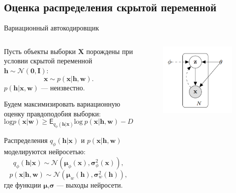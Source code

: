 \documentclass[10pt,pdf,utf8,russian,aspectratio=169]{beamer}
\begin{document}
\subsection{Оценка распределения скрытой переменной}

\begin{frame}{Вариационный автокодировщик}
\begin{columns}[T]
\begin{column}{.65\textwidth}
Пусть объекты выборки $\mathbf{X}$ порождены при условии скрытой переменной $\mathbf{h} \sim \mathcal{N}(\mathbf{0}, \mathbf{I})$:
$$
\mathbf{x} \sim p(\mathbf{x}|\mathbf{h}, \mathbf{w}).
$$
$p(\mathbf{h}|\mathbf{x}, \mathbf{w})$ --- неизвестно.

Будем максимизировать вариационную оценку правдоподобия выборки:
$$
\text{log}p(\mathbf{x}|\mathbf{w}) \geq \mathsf{E}_{q_\phi(\mathbf{h}|\mathbf{x})}\text{log}~p(\mathbf{x}|\mathbf{h}, \mathbf{w}) - D_\text{KL}(q_\phi(\mathbf{h}|\mathbf{x})||p(\mathbf{h})) \to \max.
$$

Распределения $q_\phi(\mathbf{h}|\mathbf{x})$ и $p(\mathbf{x}|\mathbf{h}, \mathbf{w})$ моделируются нейросетью:
$$
q_\phi(\mathbf{h}|\mathbf{x}) \sim \mathcal{N}(\boldsymbol{\mu}_\phi(\mathbf{x}),\boldsymbol{\sigma}_\phi^2(\mathbf{x})), 
$$
$$
p(\mathbf{x}|\mathbf{h}, \mathbf{w}) \sim \mathcal{N}(\boldsymbol{\mu}_w(\mathbf{h}),\boldsymbol{\sigma}_w^2(\mathbf{h})),
$$
где функции $\boldsymbol{\mu}$,$\boldsymbol{\sigma}$ --- выходы нейросети.\\
\end{column}%
\hfill%
\begin{column}{.25\textwidth}
\begin{figure}
  \centering
\includegraphics[width=\textwidth]{graph.png}
\end{figure}
\end{column}
\end{columns}
\end{frame}
\end{document}
